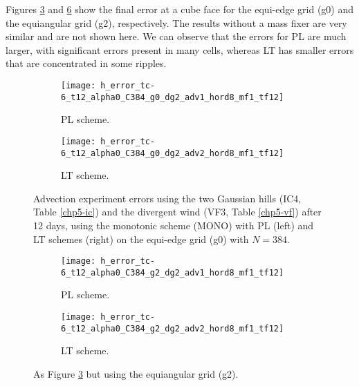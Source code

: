 Figures \ref{chp-advcs-sec-exp-adv4-errors-0} and \ref{chp-advcs-sec-exp-adv4-errors-2} show the final error at a cube face 
for the equi-edge grid (g0) and the equiangular grid (g2), respectively.
The results without a mass fixer are very similar and are not shown here. 
We can observe that the errors for PL are much larger, with significant errors present in many cells, whereas LT has smaller errors that are concentrated in some ripples.
\newpage
\begin{figure}[!htb]
	\centering
	\begin{subfigure}{0.45\textwidth}
		\centering
		\texttt{[image: h\_error\_tc-6\_t12\_alpha0\_C384\_g0\_dg2\_adv1\_hord8\_mf1\_tf12]}
		\caption{PL scheme.\label{chp-advcs-sec-exp-adv4-errors-0a}}
	\end{subfigure}
	\begin{subfigure}{0.45\textwidth}
		\centering
		\texttt{[image: h\_error\_tc-6\_t12\_alpha0\_C384\_g0\_dg2\_adv2\_hord8\_mf1\_tf12]}
		\caption{LT scheme.\label{chp-advcs-sec-exp-adv4-errors-0b}}
	\end{subfigure}
	\caption{
		Advection experiment errors using the two Gaussian hills (IC4, Table \ref{chp5-ic}) and  the divergent wind (VF3, Table \ref{chp5-vf}) after 12 days, using the monotonic scheme (MONO)
	 with PL (left) and LT schemes (right) on the equi-edge grid (g0) with $N=384$.
	 \label{chp-advcs-sec-exp-adv4-errors-0}}
\end{figure}
\begin{figure}[!htb]
	\centering
	\begin{subfigure}{0.45\textwidth}
		\centering
		\texttt{[image: h\_error\_tc-6\_t12\_alpha0\_C384\_g2\_dg2\_adv1\_hord8\_mf1\_tf12]}
		\caption{PL scheme.\label{chp-advcs-sec-exp-adv4-errors-2a}}
	\end{subfigure}
	\begin{subfigure}{0.45\textwidth}
		\centering
		\texttt{[image: h\_error\_tc-6\_t12\_alpha0\_C384\_g2\_dg2\_adv2\_hord8\_mf1\_tf12]}
		\caption{LT scheme.\label{chp-advcs-sec-exp-adv4-errors-2b}}
	\end{subfigure}
	\caption{As Figure \ref{chp-advcs-sec-exp-adv4-errors-0} but using the equiangular grid (g2).\label{chp-advcs-sec-exp-adv4-errors-2}}
\end{figure}

